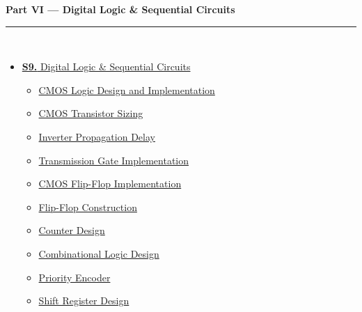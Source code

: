 \documentclass[12pt,a3paper]{article}
\begin{document}
\begin{tcolorbox}[breakable,colback=cD!5,colframe=cD,boxrule=1pt,arc=5pt,
  left=8pt,right=8pt,top=8pt,bottom=8pt,before skip=4pt]
  {\large\bfseries\textcolor{cD}{Part VI --- Digital Logic \& Sequential Circuits}}\\[5pt]
  \textcolor{cD!40}{\rule{\textwidth}{0.4pt}}\\[3pt]
  \small\begin{itemize}[leftmargin=1.2em,itemsep=1pt,label={\textcolor{cD}{$\triangleright$}}]
    \item \hyperref[sec:S9]{\textbf{S9.} Digital Logic \& Sequential Circuits}
      \begin{itemize}[leftmargin=1.5em,itemsep=0pt,label={\textcolor{cD}{$\cdot$}}]
        \item \hyperref[sub:s9-cmos]{CMOS Logic Design and Implementation}
        \item \hyperref[sub:s9-sizing]{CMOS Transistor Sizing}
        \item \hyperref[sub:s9-delay]{Inverter Propagation Delay}
        \item \hyperref[sub:s9-tg]{Transmission Gate Implementation}
        \item \hyperref[sub:s9-ff-cmos]{CMOS Flip-Flop Implementation}
        \item \hyperref[sub:s9-ff-construction]{Flip-Flop Construction}
        \item \hyperref[sub:s9-counter]{Counter Design}
        \item \hyperref[sub:s9-combo]{Combinational Logic Design}
        \item \hyperref[sub:s9-encoder]{Priority Encoder}
        \item \hyperref[sub:s9-shift]{Shift Register Design}
      \end{itemize}
  \end{itemize}
\end{tcolorbox}

\vspace{6pt}
\end{document}
